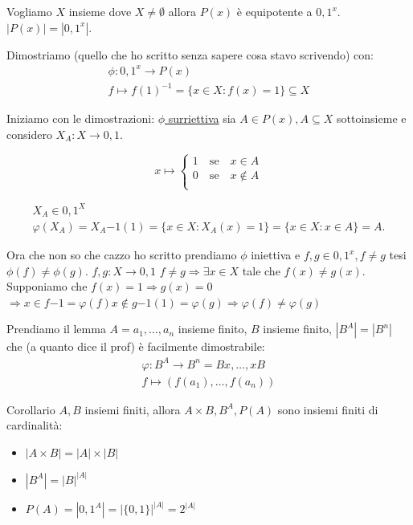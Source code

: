 \documentclass{article}
\begin{document}
Vogliamo $X$ insieme dove $X \not = \emptyset$ allora $P(x)$ è equipotente a ${0,1}^x$. \newline
$|P(x)| = |{0,1}^x|$.

Dimostriamo (quello che ho scritto senza sapere cosa stavo scrivendo) con:
\begin{align*}
        \phi : {0,1}^x \to P(x) \\
        f \mapsto {f(1)}^{-1} = \{x \in X : f(x) = 1\} \subseteq X
\end{align*}

Iniziamo con le dimostrazioni:
\underline{$\phi$ surriettiva} sia $A \in P(x), A \subseteq X$ sottoinsieme e considero $X_A : X \to {0,1}$.


\[x \mapsto  
\begin{cases}
        1 \quad \mbox{se} \quad x \in A \\
        0 \quad \mbox{se} \quad x \not \in A \\
\end{cases}
\]

\begin{align*}
X_A \in {0,1}^X \\
\varphi(X_A) = {X_A}{-1}(1) = \{x \in X : X_A(x) = 1\} = \{x \in X : x \in A\} = A.
\end{align*}

Ora che non so che cazzo ho scritto prendiamo $\phi$ iniettiva e $f,g \in {0,1}^x, f \not = g$ tesi $\phi(f) \not = \phi(g)$.
$f,g : X \to {0,1}$ \newline
$f \not = g \Rightarrow \exists x \in X$ tale che $f(x) \not = g(x)$.
Supponiamo che $f(x) = 1 \Rightarrow g(x) = 0$ \newline
$\Rightarrow x \in {f}{-1} = \varphi(f) x \not \in {g}{-1}(1) = \varphi(g) \Rightarrow \varphi(f) \not = \varphi(g)$

Prendiamo il lemma $A = {a_1,\ldots,a_n}$ insieme finito, $B$ insieme finito, $|B^A| = |B^n|$ che (a quanto dice il prof) è facilmente dimostrabile:
\begin{align*}
         \varphi : B^A \to B^n = Bx,\ldots,xB \\
                   f \mapsto (f(a_1),\ldots,f(a_n))
\end{align*}

Corollario $A,B$ insiemi finiti, allora $A \times B, B^A, P(A)$ sono insiemi finiti di cardinalità:
\begin{itemize}
        \item $|A \times B| = |A| \times |B|$	
        \item $|B^A| = |B|^{|A|}$
        \item $P(A) = |{0,1}^A| = |\{0,1\}|^{|A|} = 2^{|A|}$	
\end{itemize}
\end{document}
